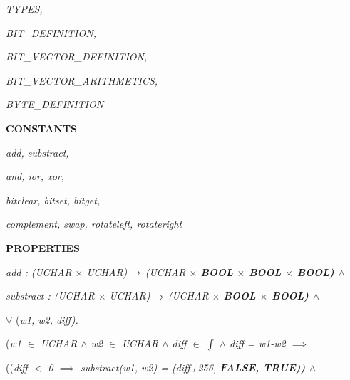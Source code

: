 \begin{sloppypar}
\hspace*{0.20in}\it TYPES\rm ,

\hspace*{0.20in}\it BIT\_DEFINITION\rm ,

\hspace*{0.20in}\it BIT\_VECTOR\_DEFINITION\rm ,

\hspace*{0.20in}\it BIT\_VECTOR\_ARITHMETICS\rm ,

\hspace*{0.20in}\it BYTE\_DEFINITION

\vspace*{4mm}
\bf CONSTANTS

\hspace*{0.20in}\it add\rm , \it substract\rm ,

\hspace*{0.20in}\it and\rm , \it ior\rm , \it xor\rm ,

\hspace*{0.20in}\it bitclear\rm , \it bitset\rm , \it bitget\rm ,

\hspace*{0.20in}\it complement\rm , \it swap\rm , \it rotateleft\rm , \it rotateright

\vspace*{4mm}
\bf PROPERTIES

\hspace*{0.20in}\it add \rm : \rm (\it UCHAR  $\times$  \it UCHAR\rm )  $\rightarrow$  \rm (\it UCHAR  $\times$  \bf BOOL  $\times$  \bf BOOL  $\times$  \bf BOOL\rm )  $\land$ 

\vspace*{4mm}
\hspace*{0.20in}\it substract \rm : \rm (\it UCHAR  $\times$  \it UCHAR\rm )  $\rightarrow$  \rm (\it UCHAR  $\times$  \bf BOOL  $\times$  \bf BOOL\rm )  $\land$ 

\hspace*{0.20in} $\forall$  \rm (\it w1\rm , \it w2\rm , \it diff\rm )\rm .

\hspace*{0.30in}\rm (\it w1  $\in$  \it UCHAR  $\land$  \it w2  $\in$  \it UCHAR  $\land$  \it diff  $\in$   $\int$   $\land$  \it diff \rm = \it w1\rm -\it w2  $\implies$ 

\hspace*{0.40in}\rm (\rm (\it diff $<$ \rm 0  $\implies$  \it substract\rm (\it w1\rm , \it w2\rm ) \rm = \rm (\it diff\rm +\rm 2\rm 5\rm 6\rm , \bf FALSE\rm , \bf TRUE\rm )\rm )  $\land$ 


\end{sloppypar}
